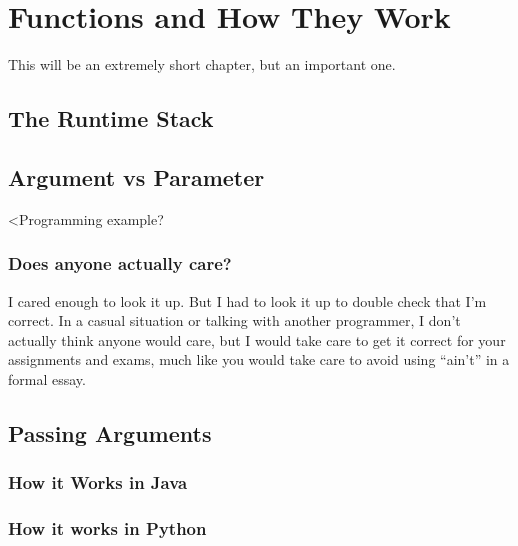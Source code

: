 \chapter{Functions and How They Work}

This will be an extremely short chapter, but an important one.

\section{The Runtime Stack}

\section{Argument vs Parameter}


<Programming example?

\subsection{Does anyone actually care?}

I cared enough to look it up.  But I had to look it up to double check that I'm correct.  
In a casual situation or talking with another programmer, I don't actually think anyone would care, but I would take care to get it correct for your assignments and exams, much like you would take care to avoid using ``ain't'' in a formal essay.

\section{Passing Arguments}


\subsection{How it Works in Java}

\subsection{How it works in Python}

